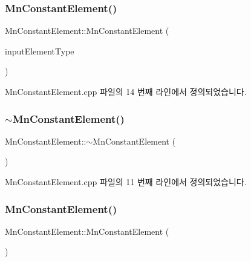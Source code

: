 \subsubsection{\texorpdfstring{Mn\+Constant\+Element()}{MnConstantElement()}\hspace{0.1cm}{\footnotesize\ttfamily [1/2]}}
{\footnotesize\ttfamily Mn\+Constant\+Element\+::\+Mn\+Constant\+Element (\begin{DoxyParamCaption}\item[{const \hyperlink{namespace_m_n_l_a7d0c6fcd5ada7e43f4059b8a9b4afb49}{Mn\+Constant\+Element\+Type} \&}]{input\+Element\+Type }\end{DoxyParamCaption})}



Mn\+Constant\+Element.\+cpp 파일의 14 번째 라인에서 정의되었습니다.

\mbox{\label{class_m_n_l_1_1_mn_constant_element_a3bde989f21552b8cc4e027934a7cd766}} 
\subsubsection{\texorpdfstring{$\sim$\+Mn\+Constant\+Element()}{~MnConstantElement()}}
{\footnotesize\ttfamily Mn\+Constant\+Element\+::$\sim$\+Mn\+Constant\+Element (\begin{DoxyParamCaption}{ }\end{DoxyParamCaption})}



Mn\+Constant\+Element.\+cpp 파일의 11 번째 라인에서 정의되었습니다.

\mbox{\label{class_m_n_l_1_1_mn_constant_element_aae694955b2ffd802eeb59034e889c62b}} 
\subsubsection{\texorpdfstring{Mn\+Constant\+Element()}{MnConstantElement()}\hspace{0.1cm}{\footnotesize\ttfamily [2/2]}}
{\footnotesize\ttfamily Mn\+Constant\+Element\+::\+Mn\+Constant\+Element (\begin{DoxyParamCaption}{ }\end{DoxyParamCaption})\hspace{0.3cm}{\ttfamily [private]}}



